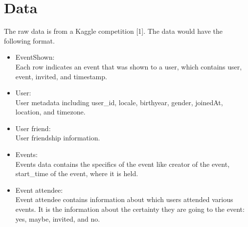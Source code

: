 \documentclass{article}
\begin{document}



\section{Data}
The raw data is from a Kaggle competition [1]. The data would have the following format. 
\begin{itemize}
\item EventShown:\\
Each row indicates an event that was shown to a user, which contains user, event, invited, and timestamp.

\item User:\\
User metadata including user\_id, locale, birthyear, gender, joinedAt, location, and timezone.

\item User friend:\\
User friendship information.

\item Events:\\
Events data contains the specifics of the event like creator of the event, start\_time of the event, where it is held.

\item Event attendee:\\
Event attendee contains information about which users attended various events. It is the information about the certainty they are going to the event: yes, maybe, invited, and no.
\end{itemize}
\end{document}
